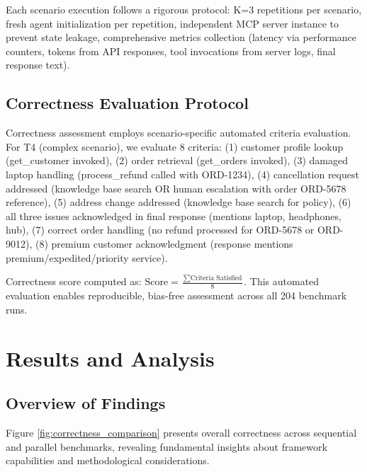 \documentclass[sigconf,nonacm]{acmart}
\begin{document}
Each scenario execution follows a rigorous protocol: K=3 repetitions per scenario, fresh agent initialization per repetition, independent MCP server instance to prevent state leakage, comprehensive metrics collection (latency via performance counters, tokens from API responses, tool invocations from server logs, final response text).

\subsection{Correctness Evaluation Protocol}

Correctness assessment employs scenario-specific automated criteria evaluation. For T4 (complex scenario), we evaluate 8 criteria: (1) customer profile lookup (get\_customer invoked), (2) order retrieval (get\_orders invoked), (3) damaged laptop handling (process\_refund called with ORD-1234), (4) cancellation request addressed (knowledge base search OR human escalation with order ORD-5678 reference), (5) address change addressed (knowledge base search for policy), (6) all three issues acknowledged in final response (mentions laptop, headphones, hub), (7) correct order handling (no refund processed for ORD-5678 or ORD-9012), (8) premium customer acknowledgment (response mentions premium/expedited/priority service).

Correctness score computed as: $\text{Score} = \frac{\sum \text{Criteria Satisfied}}{8}$. This automated evaluation enables reproducible, bias-free assessment across all 204 benchmark runs.

\section{Results and Analysis}

\subsection{Overview of Findings}

Figure \ref{fig:correctness_comparison} presents overall correctness across sequential and parallel benchmarks, revealing fundamental insights about framework capabilities and methodological considerations.
\end{document}
